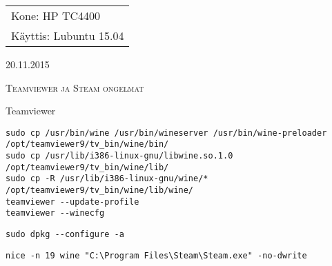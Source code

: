 \documentclass[main.tex]{subfiles}
\begin{document}
\thispagestyle{empty}
\begin{tabular}[t]{l}
Kone: HP TC4400\\
Käyttis: Lubuntu 15.04
\end{tabular}
\hfill 20.11.2015

{\scshape\Large{Teamviewer ja Steam ongelmat}}

Teamviewer

\begin{lstlisting}
sudo cp /usr/bin/wine /usr/bin/wineserver /usr/bin/wine-preloader /opt/teamviewer9/tv_bin/wine/bin/
sudo cp /usr/lib/i386-linux-gnu/libwine.so.1.0 /opt/teamviewer9/tv_bin/wine/lib/
sudo cp -R /usr/lib/i386-linux-gnu/wine/* /opt/teamviewer9/tv_bin/wine/lib/wine/
teamviewer --update-profile
teamviewer --winecfg
\end{lstlisting}

\begin{lstlisting}
sudo dpkg --configure -a
\end{lstlisting}

\begin{lstlisting}
nice -n 19 wine "C:\Program Files\Steam\Steam.exe" -no-dwrite
\end{lstlisting}
\end{document}
